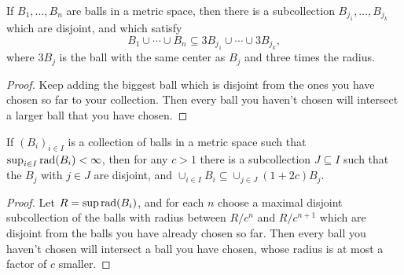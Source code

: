 \begin{lem}\label{finite-vitali} If $B_1, ..., B_n$ are balls in a metric space, then there is a subcollection $B_{j_1}, ..., B_{j_k}$ which are disjoint, and which satisfy
\[
B_1 \cup \cdots \cup B_n \subseteq 3B_{j_1} \cup \cdots \cup 3B_{j_k},
\]
where $3B_j$ is the ball with the same center as $B_j$ and three times the radius.
\end{lem}
\begin{proof} Keep adding the biggest ball which is disjoint from the ones you have chosen so far to your collection. Then every ball you haven't chosen will intersect a larger ball that you have chosen.
\end{proof}

\begin{lem}\label{vitali} If $(B_i)_{i\in I}$ is a collection of balls in a metric space such that $\sup_{i\in I} \operatorname{rad}(B_i) < \infty$, then for any $c > 1$ there is a subcollection $J \subseteq I$ such that the $B_j$ with $j \in J$ are disjoint, and $\cup_{i\in I} B_i \subseteq \cup_{j\in J} (1+2c)B_j$.
\end{lem}
\begin{proof} Let $R = \sup \operatorname{rad}(B_i)$, and for each $n$ choose a maximal disjoint subcollection of the balls with radius between $R/c^n$ and $R/c^{n+1}$ which are disjoint from the balls you have already chosen so far. Then every ball you haven't chosen will intersect a ball you have chosen, whose radius is at most a factor of $c$ smaller.
\end{proof}

